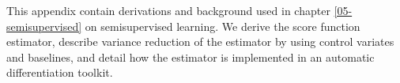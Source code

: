 % 



This appendix contain derivations and background used in chapter \ref{05-semisupervised} on semisupervised learning. We derive the score function estimator, describe variance reduction of the estimator by using control variates and baselines, and detail how the estimator is implemented in an automatic differentiation toolkit.

